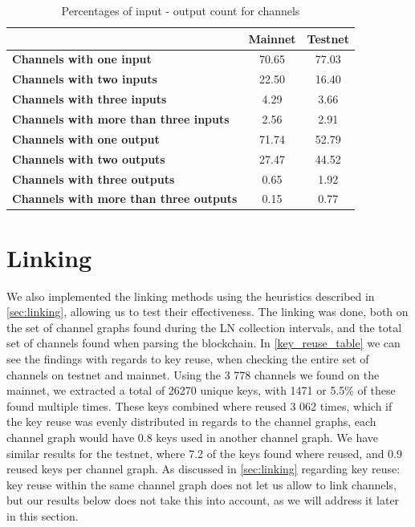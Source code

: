 \begin{table}[]
\centering
\caption{Percentages of input - output count for channels}
\label{channel_input_output}
\begin{tabular}{|l|c|c|}
\hline
                                                                     & \textbf{Mainnet} & \textbf{Testnet} \\ \hline
\textbf{Channels with one input}             & 70.65            & 77.03            \\ \hline
\textbf{Channels with two inputs}            & 22.50            & 16.40            \\ \hline
\textbf{Channels with three inputs}          & 4.29             & 3.66             \\ \hline
\textbf{Channels with more than three inputs} & 2.56             & 2.91             \\ \hline
\textbf{Channels with one output}             & 71.74            & 52.79            \\ \hline
\textbf{Channels with two outputs}             & 27.47            & 44.52            \\ \hline
\textbf{Channels with three outputs}          & 0.65             & 1.92             \\ \hline
\textbf{Channels with more than three outputs} & 0.15             & 0.77             \\ \hline
\end{tabular}
\end{table}

\section{Linking}

We also implemented the linking methods using the heuristics described in \cref{sec:linking}, allowing us to test their effectiveness.
The linking was done, both on the set of channel graphs found during the LN collection intervals, and the total set of channels found when parsing the blockchain. In \cref{key_reuse_table} we can see the findings with regards to key reuse, when checking the entire set of channels on testnet and mainnet. Using the 3 778 channels we found on the mainnet, we extracted a total of 26270 unique keys, with 1471 or 5.5\% of these found multiple times. These keys combined where reused 3 062 times, which if the key reuse was evenly distributed in regards to the channel graphs, each channel graph would have 0.8 keys used in another channel graph. We have similar results for the testnet, where 7.2 of the keys found where reused, and 0.9 reused keys per channel graph. As discussed in \cref{sec:linking} regarding key reuse: key reuse within the same channel graph does not let us allow to link channels, but our results below does not take this into account, as we will address it later in this section.

